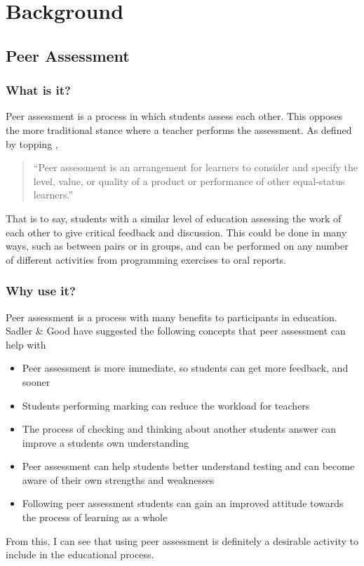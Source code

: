 \documentclass[a4paper,11pt]{report}
\begin{document}

\chapter{Background}
\section{Peer Assessment}
\subsection{What is it?}
Peer assessment is a process in which students assess each other. This opposes the more traditional stance where a teacher performs the assessment. As defined by topping \cite{topping_peer_2009},
\begin{quote}
``Peer assessment is an arrangement for learners to consider and specify the level, value, or quality of a product or performance of other equal-status learners.''
\end{quote}
That is to say, students with a similar level of education assessing the work of each other to give critical feedback and discussion. This could be done in many ways, such as between pairs or in groups, and can be performed on any number of different activities from programming exercises to oral reports.


\subsection{Why use it?}
Peer assessment is a process with many benefits to participants in education. Sadler \& Good \cite{sadler_impact_2006} have suggested the following concepts that peer assessment can help with
\begin{itemize}
 \item Peer assessment is more immediate, so students can get more feedback, and sooner
 \item Students performing marking can reduce the workload for teachers
 \item The process of checking and thinking about another students answer can improve a students own understanding
 \item Peer assessment can help students better understand testing and can become aware of their own strengths and weaknesses
 \item Following peer assessment students can gain an improved attitude towards the process of learning as a whole
\end{itemize}
From this, I can see that using peer assessment is definitely a desirable activity to include in the educational process.\par
\end{document}
